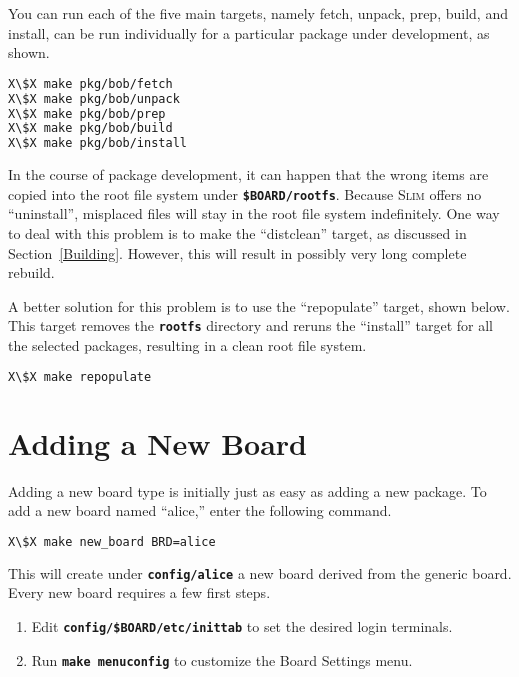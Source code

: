 \documentclass[a4paper,10pt]{article}
\newcommand{\slim}{\textsc{Slim}\xspace}
\newcommand{\fw}{\tt\bf}
\begin{document}
    You can run each of the five main targets, namely fetch, unpack,
    prep, build, and install, can be run individually for a particular
    package under development, as shown.

\begin{lstlisting}[language=bash,escapechar=X]
X\$X make pkg/bob/fetch
X\$X make pkg/bob/unpack
X\$X make pkg/bob/prep
X\$X make pkg/bob/build
X\$X make pkg/bob/install
\end{lstlisting}

    In the course of package development, it can happen that the wrong
    items are copied into the root file system under {\fw \$BOARD/rootfs}.
    Because \slim offers no ``uninstall'', misplaced files will stay
    in the root file system indefinitely. One way to deal with this
    problem is to make the ``distclean'' target, as discussed in
    Section~\ref{Building}. However, this will result in possibly very
    long complete rebuild.

    A better solution for this problem is to use the ``repopulate''
    target, shown below. This target removes the {\fw rootfs}
    directory and reruns the ``install'' target for all the selected
    packages, resulting in a clean root file system.

\begin{lstlisting}[language=bash,escapechar=X]
X\$X make repopulate
\end{lstlisting}

\section{Adding a New Board}

    Adding a new board type is initially just as easy as adding a new
    package. To add a new board named ``alice,'' enter the following
    command.

\begin{lstlisting}[language=bash,escapechar=X]
X\$X make new_board BRD=alice
\end{lstlisting}

   This will create under {\fw config/alice} a new board derived from
   the generic board. Every new board requires a few first steps.

   \begin{enumerate}
   \item Edit {\fw config/\$BOARD/etc/inittab} to set the desired login terminals.
   \item Run {\fw make menuconfig} to customize the Board Settings menu.
   \end{enumerate}
\end{document}
